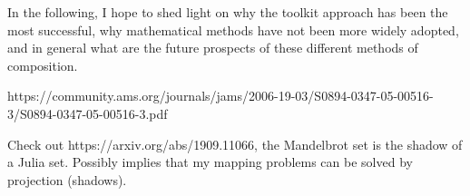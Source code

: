 \documentclass[11pt]{amsart}
\begin{document}
In the following, I hope to shed light on why the toolkit approach has been the most successful, why mathematical methods have not been more widely adopted, and in general what are the future prospects of these different methods of composition. 


https://community.ams.org/journals/jams/2006-19-03/S0894-0347-05-00516-3/S0894-0347-05-00516-3.pdf

Check out https://arxiv.org/abs/1909.11066, the Mandelbrot set is the shadow of a Julia set. Possibly implies that my mapping problems can be solved by projection (shadows).






\printbibliography
\end{document}
